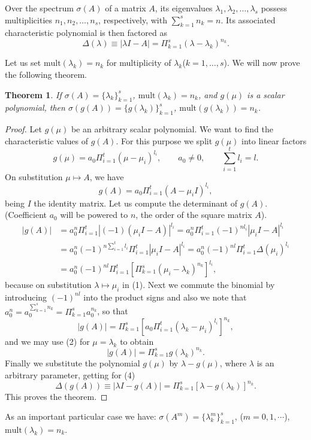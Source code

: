 \documentclass[12pt]{article}
\newtheorem{theorem*}{Theorem}
\begin{document}
Over the spectrum $\sigma(A)$ of a matrix $A$, its eigenvalues $\lambda_1, \lambda_2, \ldots, \lambda_s$ possess multiplicities $n_1, n_2, \ldots, n_s$, respectively, with $\sum_{k=1}^s n_k=n$. Its associated characteristic polynomial is then factored as  \begin{equation}
\Delta(\lambda)\equiv |\lambda I-A|=\Pi_{k=1}^s (\lambda-\lambda_k)^{n_k}.
\end{equation}        

Let us set $\mathrm{mult}(\lambda_k)=n_k$ for multiplicity of $\lambda_k$($k=1,\ldots,s$). We will now prove the following theorem.
\begin{theorem*}
If $\sigma(A)=\{\lambda_k\}_{k=1}^s$, $\mathrm{mult}(\lambda_k)=n_k$, and $g(\mu)$ is a scalar polynomial, then $\sigma(g(A))=\{g(\lambda_k)\}_{k=1}^s$, $\mathrm{mult}(g(\lambda_k))=n_k$.
\end{theorem*}
\begin{proof}
Let $g(\mu)$ be an arbitrary scalar polynomial. We want to find the characteristic values of $g(A)$. For this purpose we split $g(\mu)$ into linear factors
\begin{equation}
g(\mu)=a_0\Pi_{i=1}^t(\mu-\mu_i)^{l_i}, \qquad a_0\neq 0, \qquad \sum_{i=1}^t l_i=l.
\end{equation}
On substitution $\mu \mapsto A$, we have
\begin{equation}
g(A)=a_0\Pi_{i=1}^t(A-\mu_i I)^{l_i}, 
\end{equation}
being $I$ the identity matrix. Let us compute the determinant of $g(A)$. (Coefficient $a_0$ will be powered to $n$, the order of the square matrix $A$).
\begin{align*}
|g(A)| &= a_0^n\Pi_{i=1}^t|(-1)(\mu_iI-A)|^{l_i}=a_0^n\Pi_{i=1}^t(-1)^{nl_i}|\mu_iI-A|^{l_i} \\
       &= a_0^n(-1)^{n\sum_{i=1}^t l_i}\Pi_{i=1}^t|\mu_iI-A|^{l_i}=a_0^n(-1)^{nl}\Pi_{i=1}^t\Delta(\mu_i)^{l_i} \\
       &= a_0^n(-1)^{nl}\Pi_{i=1}^t[\Pi_{k=1}^s(\mu_i-\lambda_k)^{n_k}]^{l_i},
\end{align*} 
because on substitution $\lambda \mapsto \mu_i$ in (1). Next we commute the binomial by introducing $(-1)^{nl}$ into the product signs and also we note that $a_0^n=a_0^{\sum_{k=1}^s n_k}=\Pi_{k=1}^s a_0^{n_k}$, so that
\begin{equation*}
|g(A)|=\Pi_{k=1}^s[a_0\Pi_{i=1}^t(\lambda_k-\mu_i)^{l_i}]^{n_k},
\end{equation*}
and we may use (2) for $\mu=\lambda_k$ to obtain
\begin{equation}
|g(A)|=\Pi_{k=1}^s g(\lambda_k)^{n_k}.
\end{equation}
Finally we substitute the polynomial $g(\mu)$ by $\lambda-g(\mu)$, where $\lambda$ is an arbitrary parameter, getting for (4)
\begin{equation}
\Delta(g(A))\equiv|\lambda I-g(A)|=\Pi_{k=1}^s[\lambda-g(\lambda_k)]^{n_k}.
\end{equation}
This proves the theorem.
\end{proof}
As an important particular case we have: $\sigma(A^m)=\{\lambda_k^m\}_{k=1}^s$, ($m=0, 1, \cdots $), $\mathrm{mult}(\lambda_k)=n_k$.
\end{document}
